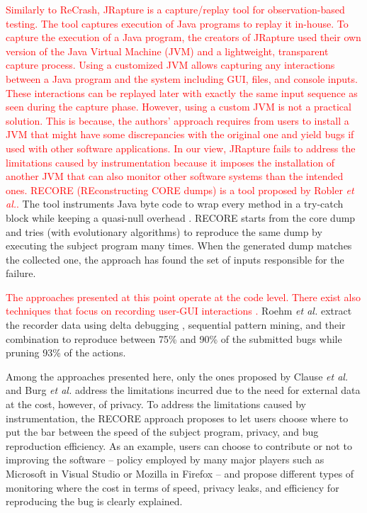 \documentclass[times, doublespace]{smrauth}
\newcommand{\red}[1]{\textcolor{red}{#1}}
\begin{document}
\red{Similarly to ReCrash, JRapture \cite{Steven2000} is a capture/replay tool for observation-based testing. The tool captures execution of Java programs to replay it in-house. To capture the execution of a Java program, the creators of JRapture used their own version of the Java Virtual Machine (JVM) and a lightweight, transparent capture process.
Using a customized JVM allows capturing any interactions between a Java program and the system including GUI, files, and console inputs.
These interactions can be replayed later  with exactly the same input sequence as seen during the capture phase.
However, using a custom JVM is not a practical solution. This is because, the authors' approach requires from users to install a JVM that might have some discrepancies with the original one and yield bugs if used with other software applications.
In our view,  JRapture fails to address the limitations caused
by instrumentation because it imposes the installation of another
JVM that can also monitor other software systems than the intended ones.
RECORE (REconstructing CORE dumps) is a tool proposed by Robler {\it et al.}.} The tool instruments Java byte code to wrap every method in a try-catch block while keeping a quasi-null overhead \cite{Rossler2013}. RECORE starts from the core dump and tries (with evolutionary algorithms) to reproduce the same dump by executing the subject program many times. When the generated dump matches the collected one, the approach has found the set of inputs responsible for the failure.

\red{The approaches presented at this point operate at the code level.
There exist also techniques that focus on recording user-GUI interactions \cite{Herbold2011,Roehm2015}.}
Roehm {\it et al.} extract the recorder data using delta debugging \cite{Zeller2002}, sequential pattern mining, and their combination to reproduce between 75\% and 90\% of the submitted bugs while pruning 93\% of the actions.

Among the approaches presented here, only the ones proposed by Clause {\it et al.} and Burg {\it et al.} address the limitations incurred due to the need for external data  at the cost, however, of privacy. To address the limitations caused by instrumentation,  the RECORE approach proposes to let users choose where to put the bar between the speed of the subject program, privacy, and bug reproduction efficiency. As an example, users can choose to contribute or not to improving the software -- policy employed by many major players such as Microsoft in Visual Studio or Mozilla in Firefox -- and propose different types of monitoring where the cost in terms of speed, privacy leaks, and efficiency for reproducing the bug is clearly explained.
\end{document}
